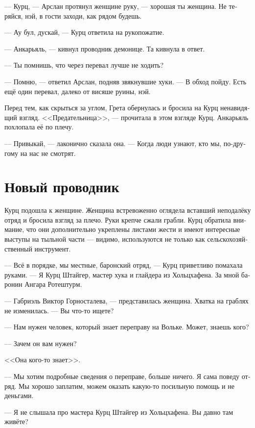 \documentclass[a4paper,12pt,fleqn]{book}\usepackage{polyglossia}\setdefaultlanguage[babelshorthands=true]{russian}\setotherlanguage{english}\defaultfontfeatures{Ligatures=TeX,Mapping=tex-text}\usepackage{xcolor}\newcommand{\ml}[3]{#2}
\begin{document}
--- Курц, --- Арслан протянул женщине руку, --- хорошая ты женщина.
Не теряйся, нэй, в гости заходи, как рядом будешь.

\ml{$0$}
{--- Ау бул, дускай, --- Курц ответила на рукопожатие.}
{``\textit{Au bul, du\th{}k\ae{},}'' Kurz answered the handshake.}

--- Анкарьяль, --- кивнул проводник демонице.
Та кивнула в ответ.

--- Ты помнишь, что через перевал лучше не ходить?

--- Помню, --- ответил Арслан, подняв звякнувшие хуки.
--- В обход пойду.
Есть ещё один перевал, далеко от висяше руины, нэй.

Перед тем, как скрыться за углом, Грета обернулась и бросила на Курц ненавидящий взгляд.
<<Предательница>>, --- прочитала в этом взгляде Курц.
Анкарьяль похлопала её по плечу.

--- Привыкай, --- лаконично сказала она.
--- Когда люди узнают, кто мы, по-другому на нас не смотрят.

\section{Новый проводник}

Курц подошла к женщине.
Женщина встревоженно оглядела вставший неподалёку отряд и бросила взгляд за плечо.
Руки крепче сжали грабли.
Курц обратила внимание, что они дополнительно укреплены листами жести и имеют интересные выступы на тыльной части --- видимо, используются не только как сельскохозяйственный инструмент.

--- Всё в порядке, мы местные, баронский отряд, --- Курц приветливо помахала руками.
--- Я Курц Штайгер, мастер хука и глайдера из Хольцхафена.
За мной баронин Ангара Ротештурм.

\ml{$0$}
{--- Габриэль Виктор Горносталева, --- представилась женщина.}
{``Gabrielle Viktor Gornostalewa,'' the woman answered.}
Хватка на граблях не изменилась.
\ml{$0$}
{--- Вы что-то ищете?}
{``Looking for something?''}

--- Нам нужен человек, который знает переправу на Вольке.
Может, знаешь кого?

--- Зачем он вам нужен?

<<Она кого-то знает>>.

--- Мы хотим подробные сведения о переправе, больше ничего.
Я сама поведу отряд.
Мы хорошо заплатим, можем оказать какую-то посильную помощь и не деньгами.

--- Я не слышала про мастера Курц Штайгер из Хольцхафена.
Вы давно там живёте?
\end{document}
